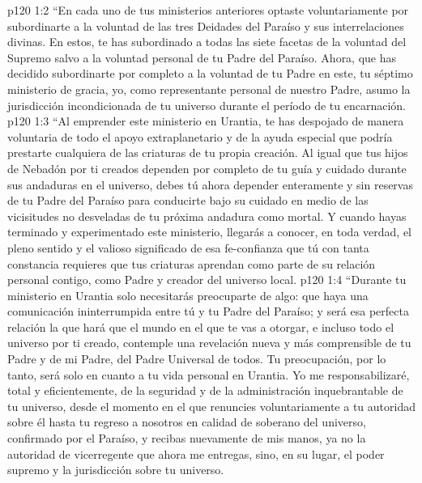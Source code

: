 \vs p120 1:2 “En cada uno de tus ministerios anteriores optaste voluntariamente por subordinarte a la voluntad de las tres Deidades del Paraíso y sus interrelaciones divinas. En estos, te has subordinado a todas las siete facetas de la voluntad del Supremo salvo a la voluntad personal de tu Padre del Paraíso. Ahora, que has decidido subordinarte por completo a la voluntad de tu Padre en este, tu séptimo ministerio de gracia, yo, como representante personal de nuestro Padre, asumo la jurisdicción incondicionada de tu universo durante el período de tu encarnación.
\vs p120 1:3 “Al emprender este ministerio en Urantia, te has despojado de manera voluntaria de todo el apoyo extraplanetario y de la ayuda especial que podría prestarte cualquiera de las criaturas de tu propia creación. Al igual que tus hijos de Nebadón por ti creados dependen por completo de tu guía y cuidado durante sus andaduras en el universo, debes tú ahora depender enteramente y sin reservas de tu Padre del Paraíso para conducirte bajo su cuidado en medio de las vicisitudes no desveladas de tu próxima andadura como mortal. Y cuando hayas terminado y experimentado este ministerio, llegarás a conocer, en toda verdad, el pleno sentido y el valioso significado de esa fe\hyp{}confianza que tú con tanta constancia requieres que tus criaturas aprendan como parte de su relación personal contigo, como Padre y creador del universo local.
\vs p120 1:4 “Durante tu ministerio en Urantia solo necesitarás preocuparte de algo: que haya una comunicación ininterrumpida entre tú y tu Padre del Paraíso; y será esa perfecta relación la que hará que el mundo en el que te vas a otorgar, e incluso todo el universo por ti creado, contemple una revelación nueva y más comprensible de tu Padre y de mi Padre, del Padre Universal de todos. Tu preocupación, por lo tanto, será solo en cuanto a tu vida personal en Urantia. Yo me responsabilizaré, total y eficientemente, de la seguridad y de la administración inquebrantable de tu universo, desde el momento en el que renuncies voluntariamente a tu autoridad sobre él hasta tu regreso a nosotros en calidad de soberano del universo, confirmado por el Paraíso, y recibas nuevamente de mis manos, ya no la autoridad de vicerregente que ahora me entregas, sino, en su lugar, el poder supremo y la jurisdicción sobre tu universo.
